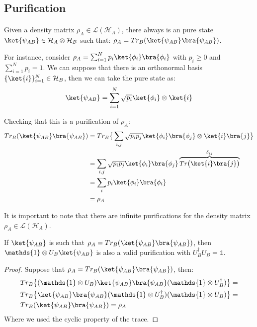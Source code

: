 \subsection{Purification}
\label{Subsection: Purification}
\paragraph{} Given a density matrix $\rho_A \in \mathcal{L}(\mathcal{H}_A)$, there always is an pure state $\ket{\psi_{AB}} \in \mathcal{H}_A \otimes \mathcal{H}_B$ such that: $\rho_A = Tr_B (\ket{\psi_{AB}}\bra{\psi_{AB}})$. 

For instance, consider $\rho_A = \sum_{i=1}^N p_i \ket{\phi_i}\bra{\phi_i}$ with $p_i \geq 0$ and $\sum_{i=1}^N p_i = 1$. We can suppose that there is an orthonormal basis $\{\ket{i} \}_{i=1}^N \in \mathcal{H}_B$, then we can take the pure state as:
\begin{equation}
    \ket{\psi_{AB}} = \sum_{i=1}^N \sqrt{p_i} \ket{\phi_i} \otimes \ket{i}
\end{equation}

Checking that this is a purification of $\rho_A$:
\begin{equation}
    \begin{split}
        Tr_B (\ket{\psi_{AB}}\bra{\psi_{AB}}) & = Tr_B \big\{ \sum_{i,j} \sqrt{p_i p_j} \ket{\phi_i}\bra{\phi_j} \otimes \ket{i}\bra{j} \big\} \\
        & = \sum_{i,j} \sqrt{p_i p_j} \ket{\phi_i}\bra{\phi_j} \overbrace{Tr \big(\ket{i}\bra{j}\big)}^{\delta_{ij}} \\
        & = \sum_i p_i \ket{\phi_i}\bra{\phi_i} \\
        & = \rho_A
    \end{split}
\end{equation}

It is important to note that there are infinite purifications for the density matrix $\rho_A \in \mathcal{L}(\mathcal{H}_A)$. 

\begin{theorem}
If $\ket{\psi_{AB}}$ is such that $\rho_A = Tr_B (\ket{\psi_{AB}}\bra{\psi_{AB}})$, then $\mathds{1} \otimes U_B \ket{\psi_{AB}}$ is also a valid purification with $U_B^{\dagger}U_B = \mathds{1}$.
\end{theorem} 

\begin{proof}
Suppose that $\rho_A = Tr_B (\ket{\psi_{AB}}\bra{\psi_{AB}})$, then:
\begin{equation}
\begin{split}
    & Tr_B \big \{ (\mathds{1} \otimes U_B) \ket{\psi_{AB}}\bra{\psi_{AB}} (\mathds{1} \otimes U_B^{\dagger}) \big \} =\\
    & Tr_B \big \{  \ket{\psi_{AB}}\bra{\psi_{AB}} (\mathds{1} \otimes U_B^{\dagger}) (\mathds{1} \otimes U_B) \big \} =\\
    & Tr_B (\ket{\psi_{AB}}\bra{\psi_{AB}}) = \rho_A
\end{split}
\end{equation}
Where we used the cyclic property of the trace.
\end{proof}